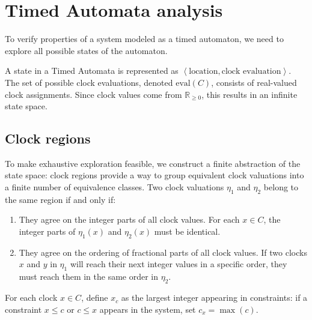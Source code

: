 \section{Timed Automata analysis}

To verify properties of a system modeled as a timed automaton, we need to explore all possible states of the automaton.

A state in a Timed Automata is represented as $\left\langle \text{location},\text{clock evaluation}\right\rangle$.
The set of possible clock evaluations, denoted $\text{eval}(C)$, consists of real-valued clock assignments.
Since clock values come from $\mathbb{R}_{\geq 0}$, this results in an infinite state space.

\subsection{Clock regions}
To make exhaustive exploration feasible, we construct a finite abstraction of the state space: clock regions provide a way to group equivalent clock valuations into a finite number of equivalence classes.
Two clock valuations $\eta_1$ and $\eta_2$ belong to the same region if and only if:
\begin{enumerate}
    \item They agree on the integer parts of all clock values.
        For each  $x\in C$, the integer parts of $\eta_1(x)$ and $\eta_2(x)$ must be identical.
    \item They agree on the ordering of fractional parts of all clock values.
        If two clocks $x$ and $y$ in $\eta_1$ will reach their next integer values in a specific order, they must reach them in the same order in $\eta_2$.
\end{enumerate}
\noindent For each clock $x\in C$, define $x_c$ as the largest integer appearing in constraints: if a constraint $x \leq c$ or $c\leq x$ appears in the system, set $c_x=\max(c)$.

